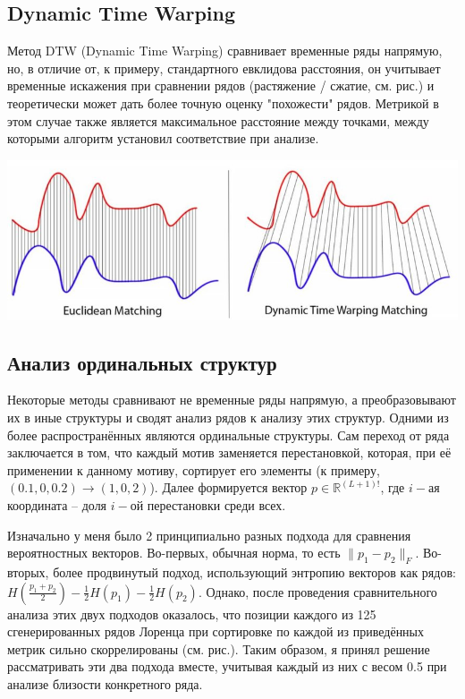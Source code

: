 \documentclass[a4paper, 12pt]{extarticle}
\begin{document}
\subsection{Dynamic Time Warping}

Метод DTW (Dynamic Time Warping) сравнивает временные ряды напрямую, но, в отличие от, к примеру, стандартного евклидова расстояния, он учитывает временные искажения при сравнении рядов (растяжение / сжатие, см. рис.) и теоретически может дать более точную оценку "похожести" рядов. Метрикой в этом случае также является максимальное расстояние между точками, между которыми алгоритм установил соответствие при анализе.

\begin{center}
    \includegraphics[width=\textwidth]{img/dtw_vis.png}
\end{center}

\subsection{Анализ ординальных структур}

Некоторые методы сравнивают не временные ряды напрямую, а преобразовывают их в иные структуры и сводят анализ рядов к анализу этих структур. Одними из более распространённых являются ординальные структуры. Сам переход от ряда заключается в том, что каждый мотив заменяется перестановкой, которая, при её применении к данному мотиву, сортирует его элементы (к примеру, $(0.1,0,0.2)\rightarrow (1,0,2)$). Далее формируется вектор $p\in\mathbb{R}^{(L+1)!}$, где $i-$ая координата – доля $i-$ой перестановки среди всех.

Изначально у меня было 2 принципиально разных подхода для сравнения вероятностных векторов. Во-первых, обычная норма, то есть $\|p_1-p_2\|_F$. Во-вторых, более продвинутый подход, использующий энтропию векторов как рядов: $H\left(\frac{p_1+p_2}{2}\right)-\frac{1}{2}H(p_1)-\frac{1}{2}H(p_2)$. Однако, после проведения сравнительного анализа этих двух подходов оказалось, что позиции каждого из 125 сгенерированных рядов Лоренца при сортировке по каждой из приведённых метрик сильно скоррелированы (см. рис.). Таким образом, я принял решение рассматривать эти два подхода вместе, учитывая каждый из них с весом 0.5 при анализе близости конкретного ряда.
\end{document}
